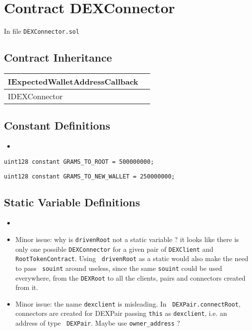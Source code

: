 
\chapter{Contract DEXConnector}

\minitoc

In file {\tt DEXConnector.sol}

\section{Contract Inheritance}


\noindent\begin{tabular}{|l|p{5cm}|}\hline
IExpectedWalletAddressCallback & \\\hline
IDEXConnector & \\\hline
\end{tabular}


\section{Constant Definitions}

\begin{itemize}
\item \issueUnits{}
\end{itemize}

\begin{lstlisting}[firstnumber=19]
  uint128 constant GRAMS_TO_ROOT = 500000000;
\end{lstlisting}

\begin{lstlisting}[firstnumber=20]
  uint128 constant GRAMS_TO_NEW_WALLET = 250000000;
\end{lstlisting}

\section{Static Variable Definitions}

\begin{itemize}
\item \issueStatic{}
\item Minor issue: why is {\tt drivenRoot} not a static variable ? it
  looks like there is only one possible {\tt DEXConnector} for a given
  pair of {\tt DEXClient} and {\tt RootTokenContract}. Using {\tt
    drivenRoot} as a static would also make the need to pass {\tt
    souint} around useless, since the same {\tt souint} could be used
  everywhere, from the {\tt DEXRoot} to all the clients, pairs and
  connectors created from it.
\item Minor issue: the name {\tt dexclient} is misleading. In {\tt
  DEXPair.connectRoot}, connectors are created for DEXPair passing
  {\tt this} as {\tt dexclient}, i.e. an address of type {\tt
    DEXPair}. Maybe use {\tt owner\_address} ?
\end{itemize}

